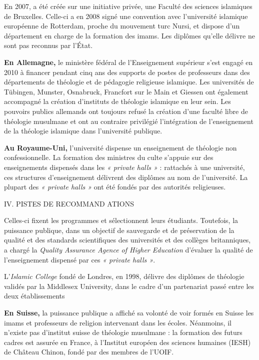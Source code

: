 En 2007, a été créée sur une initiative privée, une Faculté des sciences
islamiques de Bruxelles. Celle-ci a en 2008 signé une convention avec
l'université islamique européenne de Rotterdam, proche du mouvement turc
Nursi, et dispose d'un département en charge de la formation des imams.
Les diplômes qu'elle délivre ne sont pas reconnus par l'État.

\textbf{En Allemagne,} le ministère fédéral de l'Enseignement supérieur
s'est engagé en 2010 à financer pendant cinq ans des supports de postes
de professeurs dans des départements de théologie et de pédagogie
religieuse islamique. Les universités de Tübingen, Munster, Osnabruck,
Francfort sur le Main et Giessen ont également accompagné la création
d'instituts de théologie islamique en leur sein. Les pouvoirs publics
allemands ont toujours refusé la création d'une faculté libre de
théologie musulmane et ont au contraire privilégié l'intégration de
l'enseignement de la théologie islamique dans l'université publique.

\textbf{Au Royaume-Uni,} l'université dispense un enseignement de
théologie non confessionnelle. La formation des ministres du culte
s'appuie sur des enseignements dispensés dans les \emph{« private halls
»} : rattachés à une université, ces structures d'enseignement délivrent
des diplômes au nom de l'université. La plupart des \emph{« private
halls »} ont été fondés par des autorités religieuses.

IV. PISTES DE RECOMMAND ATIONS

Celles-ci fixent les programmes et sélectionnent leurs étudiants.
Toutefois, la puissance publique, dans un objectif de sauvegarde et de
préservation de la qualité et des standards scientifiques des
universités et des collèges britanniques, a chargé la \emph{Quality
Assurance Agence of Higher Education} d'évaluer la qualité de
l'enseignement dispensé par ces \emph{« private halls »}.

L'\emph{Islamic College} fondé de Londres, en 1998, délivre des diplômes
de théologie validés par la Middlesex University, dans le cadre d'un
partenariat passé entre les deux établissements

\textbf{En Suisse,} la puissance publique a affiché sa volonté de voir
formés en Suisse les imams et professeurs de religion intervenant dans
les écoles. Néanmoins, il n'existe pas d'institut suisse de théologie
musulmane : la formation des futurs cadres est assurée en France, à
l'Institut européen des sciences humaines (IESH) de Château Chinon,
fondé par des membres de l'UOIF.

